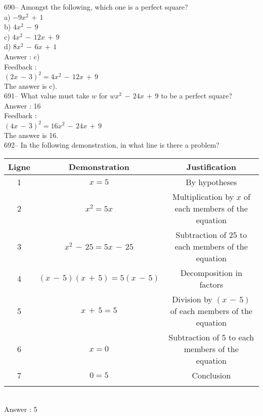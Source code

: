 \documentclass[letterpaper, 12pt]{article}
\begin{document}
690-- Amongst the following, which one is a perfect square?\\
a) $-9x^{2}\,+\,1$\\
b) $4x^{2}\,-\,9$\\
c) $4x^{2}\,-\,12x\,+\,9$\\
d) $8x^{2}\,-\,6x\,+\,1$\\

Answer : c)\\

Feedback : \\
$(2x\,-\,3)^{2}=4x^{2}\,-\,12x\,+\,9$\\
The answer is c).\\

691-- What value must take $w$ for $wx^{2}\,-\,24x\,+\,9$ to be a perfect square?\\

Answer : 16\\

Feedback : \\
$(4x\,-\,3)^{2}=16x^{2}\,-\,24x\,+\,9$\\
The answer is 16.\\

692-- In the following demonstration, in what line is there a problem?\\

\begin{tabular}{|c|c|c|} \hline
{\bf Ligne} & {\bf Demonstration} & {\bf Justification} \\ \hline \hline

1 & $x=5$ & By hypotheses\\ \hline 2 
& $x^{2}=5x$ &
Multiplication by $x$ of each members of the equation\\ \hline 3
& $x^{2}\,-\,25=5x\,-\,25$ & Subtraction of 25 to each members of the equation\\ \hline 4 
& $(x\,-\,5)(x\,+\,5)=5(x\,-\,5)$ &
Decomposition in factors\\ \hline 5 
& $x\,+\,5=5$ & Division by
$(x\,-\,5)$ of each members of the equation \\ \hline 6 & $x=0$ &
Subtraction of 5 to each members of the equation\\ \hline 7 & $0=5$ &
Conclusion \\
\hline
\multicolumn{3}{c}{}\\
\end{tabular}\\

Answer : 5\\
\end{document}
